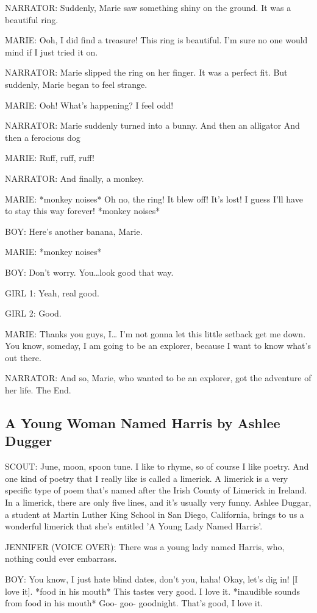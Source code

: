 NARRATOR:
Suddenly, Marie saw something shiny on the ground.
It was a beautiful ring.

MARIE:
Ooh, I did find a treasure!
This ring is beautiful.
I'm sure no one would mind if I just tried it on.

NARRATOR:
Marie slipped the ring on her finger.
It was a perfect fit.
But suddenly, Marie began to feel strange.

MARIE:
Ooh!
What's happening?
I feel odd!

NARRATOR:
Marie suddenly turned into a bunny.
And then an alligator
And then a ferocious dog

MARIE:
Ruff, ruff, ruff!

NARRATOR:
And finally, a monkey.

MARIE:
*monkey noises*
Oh no, the ring!
It blew off!
It's lost!
I guess I'll have to stay this way forever!
*monkey noises*

BOY:
Here's another banana, Marie.

MARIE:
*monkey noises*

BOY:
Don't worry.
You\dots look good that way.

GIRL 1:
Yeah, real good.

GIRL 2:
Good.

MARIE:
Thanks you guys, I\dots
I'm not gonna let this little setback get me down.
You know, someday, I am going to be an explorer, because I want to know what's out there.

NARRATOR:
And so, Marie, who wanted to be an explorer, got the adventure of her life.
The End.

\subsection{A Young Woman Named Harris by Ashlee Dugger}

SCOUT:
June, moon, spoon tune.
I like to rhyme, so of course I like poetry.
And one kind of poetry that I really like is called a limerick.
A limerick is a very specific type of poem that's named after the Irish County of Limerick in Ireland.
In a limerick, there are only five lines, and it's usually very funny.
Ashlee Duggar, a student at Martin Luther King School in San Diego, California, brings to us a wonderful limerick that she's entitled 'A Young Lady Named Harris'.

JENNIFER (VOICE OVER):
There was a young lady named Harris, who, nothing could ever embarrass.

BOY:
You know, I just hate blind dates, don't you, haha!
Okay, let's dig in!
[I love it].
*food in his mouth* This tastes very good.
I love it.
*inaudible sounds from food in his mouth*
Goo- goo-  goodnight.
That's good, I love it.

